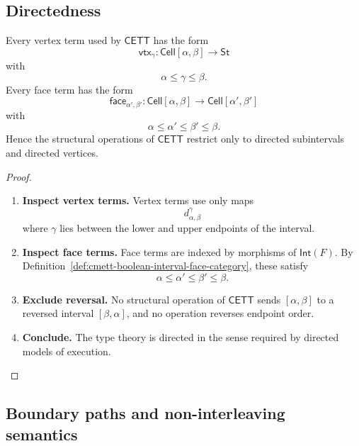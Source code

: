 \subsection{Directedness}
\label{subsec:cmett-directedness}

\begin{proposition}[Directedness]
\label{prop:cmett-directedness}
    Every vertex term used by \(\mathsf{CETT}\) has the form
    \[
        \mathsf{vtx}_\gamma:
        \mathsf{Cell}[\alpha,\beta]\to\mathsf{St}
    \]
    with
    \[
        \alpha\leq\gamma\leq\beta.
    \]
    Every face term has the form
    \[
        \mathsf{face}_{\alpha',\beta'}:
        \mathsf{Cell}[\alpha,\beta]\to\mathsf{Cell}[\alpha',\beta']
    \]
    with
    \[
        \alpha\leq\alpha'\leq\beta'\leq\beta.
    \]
    Hence the structural operations of \(\mathsf{CETT}\) restrict only to
    directed subintervals and directed vertices.
\end{proposition}

\begin{proof}
    \leavevmode
    \begin{enumerate}
        \item \textbf{Inspect vertex terms.}
        Vertex terms use only maps
        \[
            d_{\alpha,\beta}^{\gamma}
        \]
        where \(\gamma\) lies between the lower and upper endpoints of the
        interval.

        \item \textbf{Inspect face terms.}
        Face terms are indexed by morphisms of \(\mathsf{Int}(F)\). By
        Definition~\ref{def:cmett-boolean-interval-face-category}, these
        satisfy
        \[
            \alpha\leq\alpha'\leq\beta'\leq\beta.
        \]

        \item \textbf{Exclude reversal.}
        No structural operation of \(\mathsf{CETT}\) sends
        \([\alpha,\beta]\) to a reversed interval \([\beta,\alpha]\), and no
        operation reverses endpoint order.

        \item \textbf{Conclude.}
        The type theory is directed in the sense required by directed models
        of execution.
    \end{enumerate}
\end{proof}

\subsection{Boundary paths and non-interleaving semantics}
\label{subsec:cmett-boundary-paths-noninterleaving}

